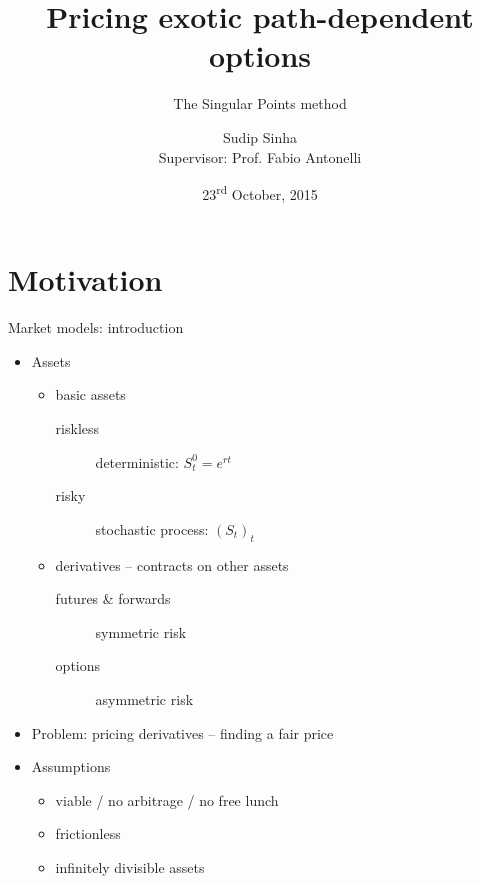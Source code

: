 \documentclass[utf8,t,xcolor=svgnames]{beamer}
\title{Pricing exotic path-dependent options}
\subtitle{The Singular Points method}
\date[2015-10-23]{23\textsuperscript{rd} October, 2015}
\institute[MathMods]{MathMods\\{Università degli Studi dell'Aquila}}
\author[Sudip Sinha]{Sudip Sinha\\{Supervisor: Prof. Fabio Antonelli}}
\begin{document}
\begin{frame}[plain]
    \maketitle
\end{frame}


\section{Motivation}

\begin{frame}{Market models: introduction}
	\begin{itemize}
		
		\item Assets
		\begin{itemize}
			\item basic assets
			\begin{description}
				\item[riskless] deterministic: $ S_t^0 = e^{rt} $
				\item[risky] stochastic process: $ (S_t)_t $
			\end{description}
			\item derivatives -- contracts on other assets
			\begin{description}
				\item[futures \& forwards] symmetric risk
				\item[options] asymmetric risk
			\end{description}			
		\end{itemize}
		
		\item Problem: pricing derivatives -- finding a fair price
		
		\item Assumptions
		\begin{itemize}
			\item viable / no arbitrage / no free lunch
			\item frictionless
			\item infinitely divisible assets
		\end{itemize}
	\end{itemize}
	
\end{frame}
\end{document}
